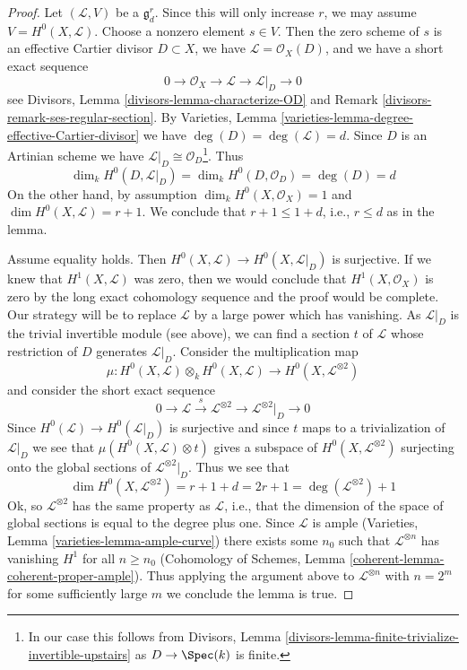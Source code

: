 \begin{proof}
Let $(\mathcal{L}, V)$ be a $\mathfrak g^r_d$. Since this will only
increase $r$, we may assume $V = H^0(X, \mathcal{L})$. Choose a
nonzero element $s \in V$.  Then the zero scheme of $s$ is an effective Cartier
divisor $D \subset X$, we have $\mathcal{L} = \mathcal{O}_X(D)$, and
we have a short exact sequence
$$
0 \to \mathcal{O}_X \to \mathcal{L} \to \mathcal{L}|_D \to 0
$$
see Divisors, Lemma \ref{divisors-lemma-characterize-OD} and
Remark \ref{divisors-remark-ses-regular-section}.
By Varieties, Lemma \ref{varieties-lemma-degree-effective-Cartier-divisor}
we have $\deg(D) = \deg(\mathcal{L}) = d$.
Since $D$ is an Artinian scheme we have
$\mathcal{L}|_D \cong \mathcal{O}_D$\footnote{In our case this
follows from Divisors, Lemma
\ref{divisors-lemma-finite-trivialize-invertible-upstairs}
as $D \to \Spec(k)$ is finite.}.
Thus
$$
\dim_k H^0(D, \mathcal{L}|_D) = \dim_k H^0(D, \mathcal{O}_D) = \deg(D) = d
$$
On the other hand, by assumption
$\dim_k H^0(X, \mathcal{O}_X) = 1$ and $\dim H^0(X, \mathcal{L}) = r + 1$.
We conclude that $r + 1 \leq 1 + d$, i.e., $r \leq d$ as in the lemma.

\medskip\noindent
Assume equality holds. Then
$H^0(X, \mathcal{L}) \to H^0(X, \mathcal{L}|_D)$ is surjective.
If we knew that $H^1(X, \mathcal{L})$ was zero, then we would
conclude that $H^1(X, \mathcal{O}_X)$ is zero by the long exact
cohomology sequence and the proof would
be complete. Our strategy will be to replace $\mathcal{L}$ by a
large power which has vanishing. As $\mathcal{L}|_D$ is the
trivial invertible module (see above), we can
find a section $t$ of $\mathcal{L}$ whose restriction
of $D$ generates $\mathcal{L}|_D$.
Consider the multiplication map
$$
\mu :
H^0(X, \mathcal{L}) \otimes_k H^0(X, \mathcal{L})
\longrightarrow
H^0(X, \mathcal{L}^{\otimes 2})
$$
and consider the short exact sequence
$$
0 \to \mathcal{L} \xrightarrow{s}
\mathcal{L}^{\otimes 2} \to \mathcal{L}^{\otimes 2}|_D \to 0
$$
Since $H^0(\mathcal{L}) \to H^0(\mathcal{L}|_D)$ is surjective and since
$t$ maps to a trivialization of $\mathcal{L}|_D$ we see that
$\mu(H^0(X, \mathcal{L}) \otimes t)$ gives a subspace of
$H^0(X, \mathcal{L}^{\otimes 2})$ surjecting onto the global sections of
$\mathcal{L}^{\otimes 2}|_D$. Thus we see that
$$
\dim H^0(X, \mathcal{L}^{\otimes 2}) = r + 1 + d = 2r + 1 =
\deg(\mathcal{L}^{\otimes 2}) + 1
$$
Ok, so $\mathcal{L}^{\otimes 2}$ has the same property as $\mathcal{L}$, i.e.,
that the dimension of the space of global sections is equal to the
degree plus one. Since $\mathcal{L}$ is ample
(Varieties, Lemma \ref{varieties-lemma-ample-curve})
there exists some $n_0$ such that $\mathcal{L}^{\otimes n}$
has vanishing $H^1$ for all $n \geq n_0$
(Cohomology of Schemes, Lemma \ref{coherent-lemma-coherent-proper-ample}).
Thus applying the argument above to $\mathcal{L}^{\otimes n}$
with $n = 2^m$ for some sufficiently large $m$ we conclude the
lemma is true.
\end{proof}

